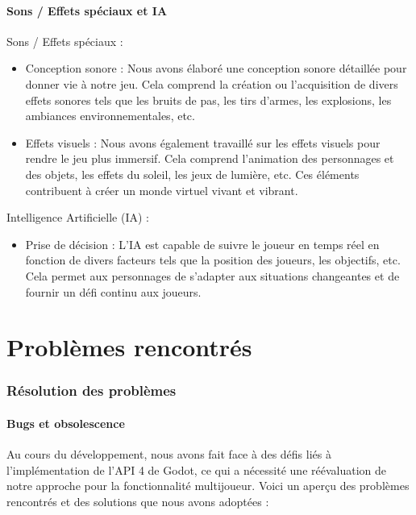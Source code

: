 \documentclass[
	article,			%
	11pt,				%
	oneside,			%
	a4paper,			%
	chapter=TITLE,
	french,			%
	sumario=tradicional
	]{base_nt}
\begin{document}
\newpage

\subsection{Sons / Effets spéciaux et IA}

Sons / Effets spéciaux :

\begin{itemize}
    \item Conception sonore : Nous avons élaboré une conception sonore détaillée pour donner vie à notre jeu. Cela comprend la création ou l'acquisition de divers effets sonores tels que les bruits de pas, les tirs d'armes, les explosions, les ambiances environnementales, etc.
    \item Effets visuels : Nous avons également travaillé sur les effets visuels pour rendre le jeu plus immersif. Cela comprend l'animation des personnages et des objets, les effets du soleil, les jeux de lumière, etc. Ces éléments contribuent à créer un monde virtuel vivant et vibrant.
\end{itemize}

Intelligence Artificielle (IA) :

\begin{itemize}
    \item Prise de décision : L'IA est capable de suivre le joueur en temps réel en fonction de divers facteurs tels que la position des joueurs, les objectifs, etc. Cela permet aux personnages de s'adapter aux situations changeantes et de fournir un défi continu aux joueurs.
\end{itemize}

\vspace{2.3cm}

\newpage

\vspace*{5cm}

\part{Problèmes rencontrés}
\section{Résolution des problèmes}

\subsection{Bugs et obsolescence}

Au cours du développement, nous avons fait face à des défis liés à l'implémentation de l'API 4 de Godot, ce qui a nécessité une réévaluation de notre approche pour la fonctionnalité multijoueur. Voici un aperçu des problèmes rencontrés et des solutions que nous avons adoptées :
\end{document}
